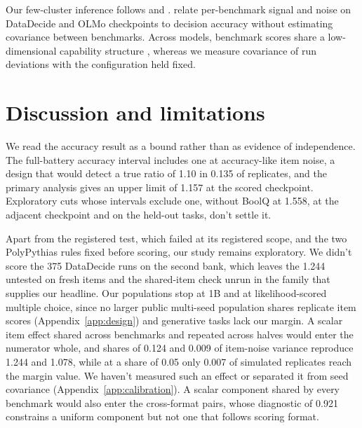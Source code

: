 Our few-cluster inference follows \citet{cameron2008} and \citet{mackinnon2017}. \citet{heineman2025} relate per-benchmark signal and noise on DataDecide and OLMo checkpoints to decision accuracy without estimating covariance between benchmarks. Across models, benchmark scores share a low-dimensional capability structure \citep{ruan2024,burnell2023revealing}, whereas we measure covariance of run deviations with the configuration held fixed.

\section{Discussion and limitations}
We read the accuracy result as a bound rather than as evidence of independence. The full-battery accuracy interval includes one at accuracy-like item noise, a design that would detect a true ratio of 1.10 in 0.135 of replicates, and the primary analysis gives an upper limit of 1.157 at the scored checkpoint. Exploratory cuts whose intervals exclude one, without BoolQ at 1.558, at the adjacent checkpoint and on the held-out tasks, don't settle it.

Apart from the registered test, which failed at its registered scope, and the two PolyPythias rules fixed before scoring, our study remains exploratory. We didn't score the 375 DataDecide runs on the second bank, which leaves the 1.244 untested on fresh items and the shared-item check unrun in the family that supplies our headline. Our populations stop at 1B and at likelihood-scored multiple choice, since no larger public multi-seed population shares replicate item scores (Appendix~\ref{app:design}) and generative tasks lack our margin. A scalar item effect shared across benchmarks and repeated across halves would enter the numerator whole, and shares of 0.124 and 0.009 of item-noise variance reproduce 1.244 and 1.078, while at a share of 0.05 only 0.007 of simulated replicates reach the margin value. We haven't measured such an effect or separated it from seed covariance (Appendix~\ref{app:calibration}). A scalar component shared by every benchmark would also enter the cross-format pairs, whose diagnostic of 0.921 constrains a uniform component but not one that follows scoring format.

